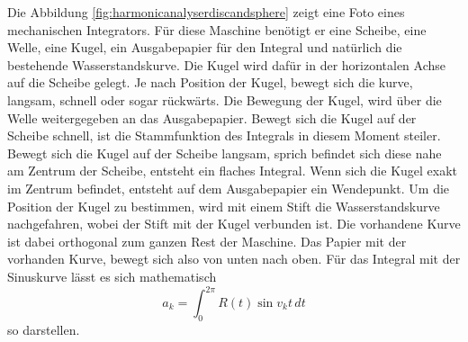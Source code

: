 Die Abbildung \ref{fig:harmonicanalyserdiscandsphere} zeigt eine Foto eines mechanischen Integrators.
Für diese Maschine benötigt er eine Scheibe, eine Welle, eine Kugel, ein Ausgabepapier für den Integral und natürlich die bestehende Wasserstandskurve.
Die Kugel wird dafür in der horizontalen Achse auf die Scheibe gelegt.
Je nach Position der Kugel, bewegt sich die kurve, langsam, schnell oder sogar rückwärts.
Die Bewegung der Kugel, wird über die Welle weitergegeben an das Ausgabepapier.
Bewegt sich die Kugel auf der Scheibe schnell, ist die Stammfunktion des Integrals in diesem Moment steiler.
Bewegt sich die Kugel auf der Scheibe langsam, sprich befindet sich diese nahe am Zentrum der Scheibe, entsteht ein flaches Integral.
Wenn sich die Kugel exakt im Zentrum befindet, entsteht auf dem Ausgabepapier ein Wendepunkt.
Um die Position der Kugel zu bestimmen, wird mit einem Stift die Wasserstandskurve nachgefahren, wobei der Stift mit der Kugel verbunden ist.
Die vorhandene Kurve ist dabei orthogonal zum ganzen Rest der Maschine.
Das Papier mit der vorhanden Kurve, bewegt sich also von unten nach oben.
Für das Integral mit der Sinuskurve lässt es sich mathematisch \[
a_k
=  
\int_0^{2\pi} R(t) \sin v_kt \, dt
\]
so darstellen.


